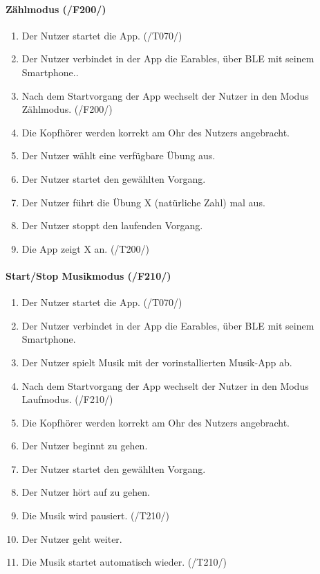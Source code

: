\documentclass[a4paper,12pt]{article}
\begin{document}
    
    \paragraph{Zählmodus (/F200/)}
      \begin{enumerate}
        \item Der Nutzer startet die App. (/T070/)
        \item Der Nutzer verbindet in der App die \gls{Earables}, über \gls{BLE} mit seinem Smartphone..
        \item Nach dem Startvorgang der App wechselt der Nutzer in den Modus \glqq Zählmodus\grqq . (/F200/)
        \item Die Kopfhörer werden korrekt am Ohr des Nutzers angebracht.
        \item Der Nutzer wählt eine verfügbare Übung aus. 
        \item Der Nutzer startet den gewählten \Gls{Vorgang}.
        \item Der Nutzer führt die Übung X (natürliche Zahl) mal aus.
        \item Der Nutzer stoppt den laufenden \Gls{Vorgang}.
        \item Die App zeigt X an. (/T200/)
      \end{enumerate}

    
    \paragraph{Start/Stop Musikmodus (/F210/)}
      \begin{enumerate}
        \item Der Nutzer startet die App. (/T070/)
        \item Der Nutzer verbindet in der App die \gls{Earables}, über \gls{BLE} mit seinem Smartphone.
        \item Der Nutzer spielt Musik mit der vorinstallierten Musik-App ab.
        \item Nach dem Startvorgang der App wechselt der Nutzer in den Modus \glqq Laufmodus\grqq . (/F210/)
        \item Die Kopfhörer werden korrekt am Ohr des Nutzers angebracht.
        \item Der Nutzer beginnt zu gehen.
        \item Der Nutzer startet den gewählten \Gls{Vorgang}.
        \item Der Nutzer hört auf zu gehen.
        \item Die Musik wird pausiert. (/T210/)
        \item Der Nutzer geht weiter.
        \item Die Musik startet automatisch wieder. (/T210/)
      \end{enumerate}
  
\end{document}
